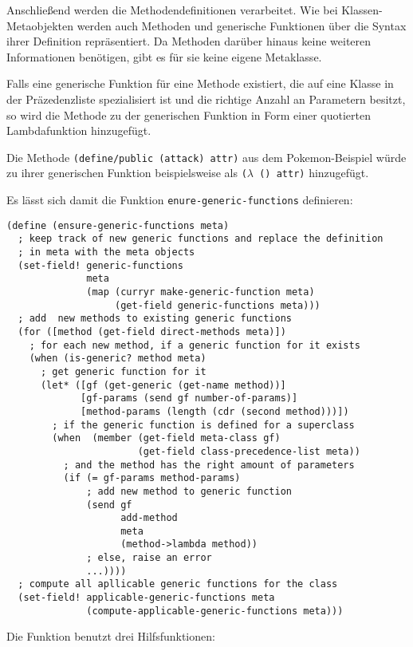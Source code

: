 Anschließend werden die Methodendefinitionen verarbeitet. Wie bei Klas\-sen-Me\-ta\-ob\-jek\-ten werden auch Methoden und generische Funktionen über die Syntax ihrer Definition repräsentiert. Da Methoden darüber hinaus keine weiteren Informationen benötigen, gibt es für sie keine eigene Metaklasse. 

Falls eine generische Funktion für eine Methode existiert, die auf eine Klasse in der Präzedenzliste spezialisiert ist und die richtige Anzahl an Parametern besitzt, so wird die Methode zu der generischen Funktion in Form einer quotierten Lambdafunktion hinzugefügt. 

Die Methode \texttt{(define/public (attack) {\textquotesingle}attr)} aus dem Pokemon-Beispiel würde zu ihrer generischen Funktion beispielsweise als \texttt{($\lambda$ () {\textquotesingle}attr)} hinzugefügt. 

Es lässt sich damit die Funktion \texttt{enure-generic-functions} definieren:

\begin{lstlisting}
(define (ensure-generic-functions meta)
  ; keep track of new generic functions and replace the definition
  ; in meta with the meta objects
  (set-field! generic-functions
              meta
              (map (curryr make-generic-function meta)
                   (get-field generic-functions meta)))
  ; add  new methods to existing generic functions
  (for ([method (get-field direct-methods meta)])
    ; for each new method, if a generic function for it exists
    (when (is-generic? method meta)
      ; get generic function for it
      (let* ([gf (get-generic (get-name method))]
             [gf-params (send gf number-of-params)]
             [method-params (length (cdr (second method)))])
        ; if the generic function is defined for a superclass
        (when  (member (get-field meta-class gf)
                       (get-field class-precedence-list meta))
          ; and the method has the right amount of parameters
          (if (= gf-params method-params)
              ; add new method to generic function
              (send gf
                    add-method
                    meta
                    (method->lambda method))
              ; else, raise an error
              ...))))
  ; compute all apllicable generic functions for the class
  (set-field! applicable-generic-functions meta
              (compute-applicable-generic-functions meta)))
\end{lstlisting}

Die Funktion benutzt drei Hilfsfunktionen:

